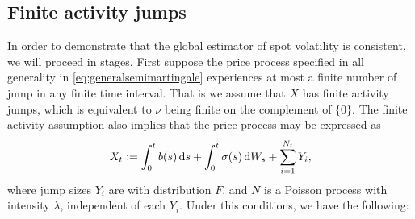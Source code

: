 \subsection{Finite activity \levy jumps}
In order to demonstrate that the global estimator of spot volatility is consistent, we will proceed in stages.  First suppose the price process specified in all generality in \eqref{eq:generalsemimartingale} experiences at most a finite number of jump in any finite time interval. That is we assume that $X$ has finite activity jumps, which is equivalent to $\nu$ being finite on the complement of   $\{0\}$. The finite activity assumption also implies that the price process may be expressed as  
\begin{align}
  X_t :=  \int_0^t b(s) \D s + \int_0^t \sigma(s) \D W_s +  \sum^{N_t}_{ i = 1} Y_i,
  \label{jumpfa}
\end{align}
where jump sizes $Y_i$ are \iid with distribution $F$, and $N$ is a Poisson process with intensity $\lambda$, independent of each $Y_i$. Under this conditions, we have the following:

